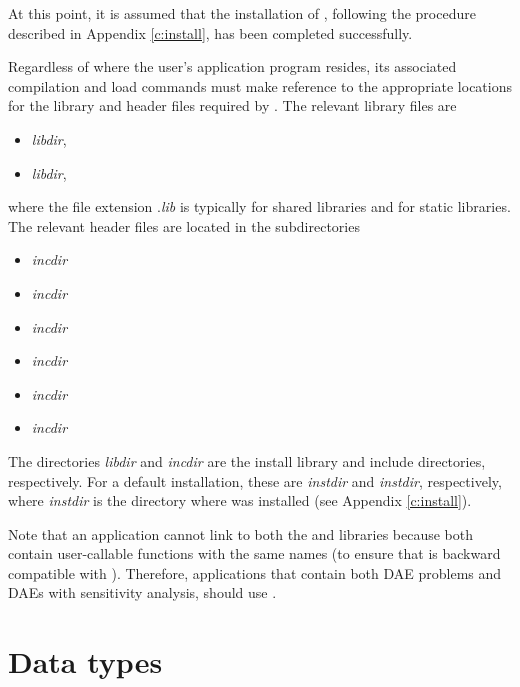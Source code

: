 At this point, it is assumed that the installation of {\ida},
following the procedure described in Appendix \ref{c:install}, has
been completed successfully.

Regardless of where the user's application program resides, its
associated compilation and load commands must make reference to the
appropriate locations for the library and header files required by
{\ida}.  The relevant library files are
\begin{itemize}
\item {\em libdir},
\item {\em libdir},
\end{itemize}
where the file extension .{\em lib} is typically  for shared libraries
and  for static libraries. The relevant header files are located in
the subdirectories
\begin{itemize}
\item {\em incdir}
\item {\em incdir}
\item {\em incdir}
\item {\em incdir}
\item {\em incdir}
\item {\em incdir}
\end{itemize}
The directories {\em libdir} and {\em incdir} are the install library
and include directories, respectively. For a default installation,
these are {\em instdir} and {\em instdir},
respectively, where {\em instdir} is the directory where {\sundials}
was installed (see Appendix \ref{c:install}).

Note that an application cannot link to both the {\ida} and {\idas} libraries
because both contain user-callable functions with the same names (to ensure that {\idas}
is backward compatible with {\ida}). Therefore, applications that contain both
DAE problems and DAEs with sensitivity analysis, should use {\idas}.

\section{Data types}\label{s:types}


